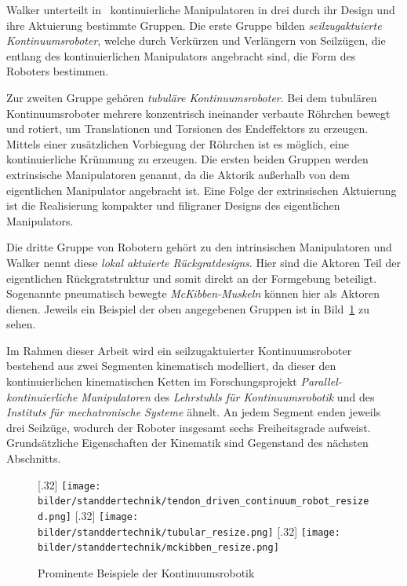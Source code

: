Walker unterteilt in~\cite{Wal13} kontinuierliche Manipulatoren in drei durch ihr Design und ihre Aktuierung bestimmte Gruppen. Die erste Gruppe bilden \textit{seilzugaktuierte Kontinuumsroboter}, welche durch Verkürzen und Verlängern von Seilzügen, die entlang des kontinuierlichen Manipulators angebracht sind, die Form des Roboters bestimmen. 

Zur zweiten Gruppe gehören \textit{tubuläre Kontinuumsroboter}. Bei dem tubulären Kontinuumsroboter mehrere konzentrisch ineinander verbaute Röhrchen bewegt und rotiert, um Translationen und Torsionen des Endeffektors zu erzeugen. Mittels einer zusätzlichen Vorbiegung der Röhrchen ist es möglich, eine kontinuierliche Krümmung zu erzeugen. 
Die ersten beiden Gruppen werden extrinsische Manipulatoren genannt, da die Aktorik außerhalb von dem eigentlichen Manipulator angebracht ist. Eine Folge der extrinsischen Aktuierung ist die Realisierung kompakter und filigraner Designs des eigentlichen Manipulators. 

Die dritte Gruppe von Robotern gehört zu den intrinsischen Manipulatoren und Walker nennt diese \textit{lokal aktuierte Rückgratdesigns}. Hier sind die Aktoren Teil der eigentlichen Rückgratstruktur und somit direkt an der Formgebung beteiligt. Sogenannte pneumatisch bewegte \textit{McKibben-Muskeln} können hier als Aktoren dienen. Jeweils ein Beispiel der oben angegebenen Gruppen ist in Bild~\ref{fig:drei_kontinuumsroboter} zu sehen. \newline

Im Rahmen dieser Arbeit wird ein seilzugaktuierter Kontinuumsroboter bestehend aus zwei Segmenten kinematisch modelliert, da dieser den kontinuierlichen kinematischen Ketten im Forschungsprojekt \textit{Parallel-kontinuierliche Manipulatoren} des \textit{Lehrstuhls für Kontinuumsrobotik} und des \textit{Instituts für mechatronische Systeme} ähnelt. An jedem Segment enden jeweils drei Seilzüge, wodurch der Roboter insgesamt sechs Freiheitsgrade aufweist. Grundsätzliche Eigenschaften der Kinematik sind Gegenstand des nächsten Abschnitts.

\begin{figure}[t!]
\centering
{}[.32\linewidth]
{\texttt{[image: bilder/standdertechnik/tendon\_driven\_continuum\_robot\_resized.png]}}
\label{fig:seilzugaktuiert}
[.32\linewidth]
{\texttt{[image: bilder/standdertechnik/tubular\_resize.png]}}
\label{fig:tubulaer}
[.32\linewidth]
{\texttt{[image: bilder/standdertechnik/mckibben\_resize.png]}}
\caption[Prominente Beispiele der Kontinuumsrobotik]{Prominente Beispiele der Kontinuumsrobotik}
\label{fig:drei_kontinuumsroboter}
\end{figure}



